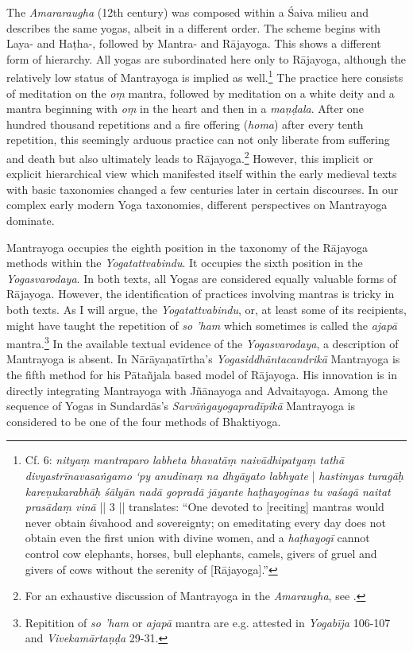 The \emph{Amararaugha} (12th century) was composed within a Śaiva milieu and describes the same yogas, albeit in a different order. The scheme begins with Laya- and Haṭha-, followed by Mantra- and Rājayoga. This shows a different form of hierarchy. All yogas are subordinated here only to Rājayoga, although the relatively low status of Mantrayoga is implied as well.\footnote{Cf.  6: \textit{nityaṃ mantraparo labheta bhavatāṃ naivādhipatyaṃ tathā divyastrīnavasaṅgamo ‘py anudinaṃ na dhyāyato labhyate} | \textit{hastinyas turagāḥ kareṇukarabhāḥ śālyān nadā gopradā jāyante haṭhayoginas tu vaśagā naitat prasādaṃ vinā} || 3 || \citeauthor{amaraugha2024} translates: ``One devoted to [reciting] mantras would never obtain śivahood and sovereignty; on emeditating every day does not obtain even the first union with divine women, and a \textit{haṭhayogī} cannot control cow elephants, horses, bull elephants, camels, givers of gruel and givers of cows without the serenity of [Rājayoga].''} The practice here consists of meditation on the \textit{oṃ} mantra, followed by meditation on a white deity and a mantra beginning with \textit{oṃ} in the heart and then in a \textit{maṇḍala}. After one hundred thousand repetitions and a fire offering (\textit{homa}) after every tenth repetition, this seemingly arduous practice can not only liberate from suffering and death but also ultimately leads to Rājayoga.\footnote{For an exhaustive discussion of Mantrayoga in the \emph{Amaraugha}, see \citeauthor[2024: 34-35]{amaraugha2024}.} However, this implicit or explicit hierarchical view which manifested itself within the early medieval texts with basic taxonomies changed a few centuries later in certain discourses. In our complex early modern Yoga taxonomies, different perspectives on Mantrayoga dominate.     

Mantrayoga occupies the eighth position in the taxonomy of the Rājayoga methods within the \textit{Yogatattvabindu}. It occupies the sixth position in the \textit{Yogasvarodaya}. In both texts, all Yogas are considered equally valuable forms of Rājayoga. However, the identification of practices involving mantras is tricky in both texts. As I will argue, the \textit{Yogatattvabindu}, or, at least some of its recipients, might have taught the repetition of \textit{so 'ham} which sometimes is called the \textit{ajapā} mantra.\footnote{Repitition of \textit{so 'ham} or \textit{ajapā} mantra are e.g. attested in \emph{Yogabīja} 106-107 and \emph{Vivekamārtaṇḍa} 29-31.} In the available textual evidence of the \emph{Yogasvarodaya}, a description of Mantrayoga is absent. In Nārāyaṇatīrtha's \textit{Yogasiddhāntacandrikā} Mantrayoga is the fifth method for his Pātañjala based model of Rājayoga. His innovation is in directly integrating Mantrayoga with Jñānayoga and Advaitayoga. Among the sequence of Yogas in Sundardās's \textit{Sarvāṅgayogapradīpikā} Mantrayoga is considered to be one of the four methods of Bhaktiyoga. 

